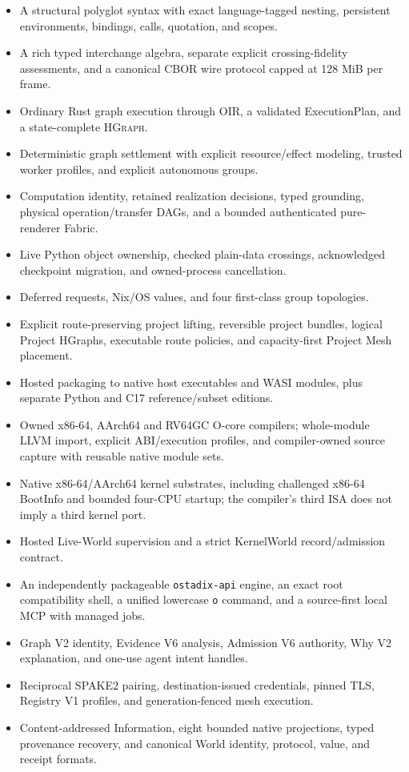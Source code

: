 \documentclass[11pt,oneside]{article}
\newcommand{\oir}{{\mdseries\textsc{OIR}}}
\newcommand{\hgraph}{{\mdseries\textsc{HGraph}}}
\begin{document}
\begin{itemize}
  \item A structural polyglot syntax with exact language-tagged nesting,
        persistent environments, bindings, calls, quotation, and scopes.
  \item A rich typed interchange algebra, separate explicit crossing-fidelity
        assessments, and a canonical CBOR wire protocol capped at 128 MiB per
        frame.
  \item Ordinary Rust graph execution through \oir{}, a validated
        ExecutionPlan, and a state-complete \hgraph{}.
  \item Deterministic graph settlement with explicit resource/effect
        modeling, trusted worker profiles, and explicit autonomous groups.
  \item Computation identity, retained realization decisions, typed
        grounding, physical operation/transfer DAGs, and a bounded
        authenticated pure-renderer Fabric.
  \item Live Python object ownership, checked plain-data crossings,
        acknowledged checkpoint migration, and owned-process cancellation.
  \item Deferred requests, Nix/OS values, and four first-class group
        topologies.
  \item Explicit route-preserving project lifting, reversible project bundles,
        logical Project HGraphs, executable route policies, and capacity-first
        Project Mesh placement.
  \item Hosted packaging to native host executables and WASI modules, plus
        separate Python and C17 reference/subset editions.
  \item Owned x86-64, AArch64 and RV64GC O-core compilers; whole-module LLVM
        import, explicit ABI/execution profiles, and compiler-owned source
        capture with reusable native module sets.
  \item Native x86-64/AArch64 kernel substrates, including challenged x86-64
        BootInfo and bounded four-CPU startup; the compiler's third ISA does
        not imply a third kernel port.
  \item Hosted Live-World supervision and a strict KernelWorld record/admission
        contract.
  \item An independently packageable \texttt{ostadix-api} engine, an exact
        root compatibility shell, a unified lowercase \texttt{o} command, and
        a source-first local MCP with managed jobs.
  \item Graph V2 identity, Evidence V6 analysis, Admission V6 authority, Why V2
        explanation, and one-use agent intent handles.
  \item Reciprocal SPAKE2 pairing, destination-issued credentials, pinned TLS,
        Registry V1 profiles, and generation-fenced mesh execution.
  \item Content-addressed Information, eight bounded native projections,
        typed provenance recovery, and canonical World identity, protocol,
        value, and receipt formats.
\end{itemize}
\end{document}

